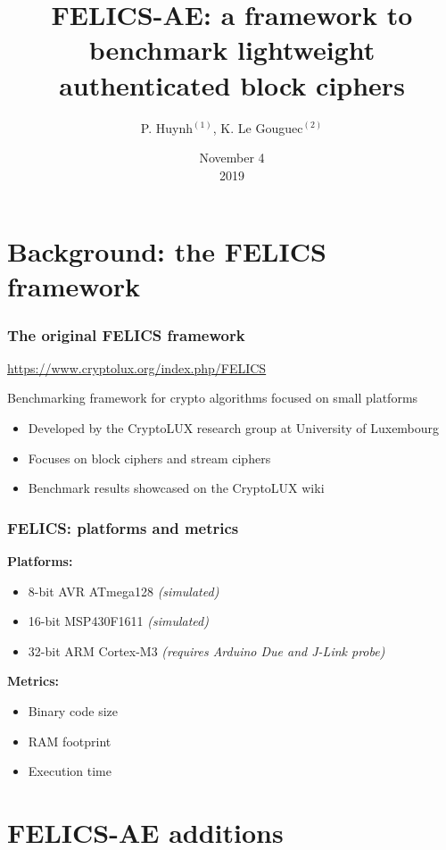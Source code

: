 \documentclass[english]{beamer}
\title{
  FELICS-AE: a framework to benchmark lightweight authenticated block ciphers
}
\date{November 4\\2019}
\author{P. Huynh$^{(1)}$, K. Le Gouguec$^{(2)}$}
\institute{$^{(1)}$LORIA CNRS, $^{(2)}$Airbus CyberSecurity}
\begin{document}
\begin{frame}
  \titlepage
\end{frame}

\begin{frame}
  \tableofcontents
\end{frame}

\section[FELICS]{Background: the FELICS framework}

\begin{frame}
  \frametitle{The original FELICS framework}

  \url{https://www.cryptolux.org/index.php/FELICS}

  Benchmarking framework for crypto algorithms focused on small platforms

  \begin{itemize}
  \item Developed by the CryptoLUX research group at University of Luxembourg
  \item Focuses on block ciphers and stream ciphers
  \item Benchmark results showcased on the CryptoLUX wiki
  \end{itemize}

\end{frame}

\begin{frame}
  \frametitle{FELICS: platforms and metrics}

  \textbf{Platforms:}
  \begin{itemize}
  \item 8-bit AVR ATmega128 \emph{(simulated)}
  \item 16-bit MSP430F1611 \emph{(simulated)}
  \item 32-bit ARM Cortex-M3 \emph{(requires Arduino Due and J-Link probe)}
  \end{itemize}

  \pause

  \textbf{Metrics:}
  \begin{itemize}
  \item Binary code size
  \item RAM footprint
  \item Execution time
  \end{itemize}

\end{frame}

\section[FELICS-AE]{FELICS-AE additions}
\end{document}
